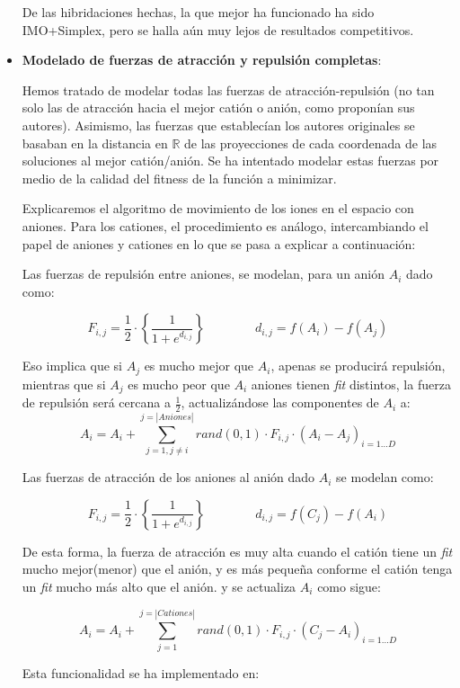 \documentclass[a4paper,11pt]{article}
\begin{document}
\begin{itemize}
\begin{itemize}
 \end{itemize}
 
  De las hibridaciones hechas, la que mejor ha funcionado ha sido IMO+Simplex, pero se halla aún muy lejos de resultados
  competitivos.
 \item \textbf{Modelado de fuerzas de atracción y repulsión completas}:
 
 Hemos tratado de modelar todas las fuerzas de atracción-repulsión (no tan solo las de atracción hacia
 el mejor catión o anión, como proponían sus autores). Asimismo, las fuerzas que establecían los autores
 originales se basaban en la distancia en $\mathbb{R}$ de las proyecciones de cada coordenada de las soluciones
 al mejor catión/anión. Se ha intentado modelar estas fuerzas por medio de la calidad del fitness de la función
 a minimizar. 
 
 Explicaremos el algoritmo de movimiento de los iones en el espacio con aniones. Para los cationes, el procedimiento es
 análogo, intercambiando el papel de aniones y cationes en lo que se pasa a explicar a continuación:
 
 Las fuerzas de repulsión entre aniones, se modelan, para un anión $A_i$ dado como:
 
 $$F_{i,j} = \frac{1}{2} \cdot \left\{\frac{1}{1+e^{d_{i,j}}}\right\} \qquad \qquad d_{i,j} = {f(A_i) - f(A_j)}$$ 
 
 Eso implica que si $A_j$ es mucho mejor que $A_i$, apenas se producirá repulsión, mientras que si $A_j$ es mucho peor que $A_i$
 aniones tienen \textit{fit} distintos, la fuerza de repulsión será cercana a $\frac{1}{2}$, actualizándose las componentes de $A_i$
 a:
  $$A_i = A_i + \sum_{j=1, j\neq i}^{j=|Aniones|} rand(0,1)\cdot F_{i,j}\cdot (A_i - A_j)_{i=1\ldots D}$$
  
 Las fuerzas de atracción de los aniones al anión dado $A_i$ se modelan como:
 
 $$F_{i,j} = \frac{1}{2} \cdot \left\{\frac{1}{1+e^{d_{i,j}}}\right\} \qquad \qquad d_{i,j} = {f(C_j) - f(A_i)}$$ 

 De esta forma, la fuerza de atracción es muy alta cuando el catión tiene un \textit{fit} mucho mejor(menor) que el anión, y
 es más pequeña conforme el catión tenga un \textit{fit} mucho más alto que el anión.
 y se actualiza $A_i$ como sigue:
 
 $$A_i = A_i + \sum_{j=1}^{j=|Cationes|} rand(0,1)\cdot F_{i,j}\cdot (C_j - A_i)_{i=1\ldots D}$$
 
 Esta funcionalidad se ha implementado en:
 

\end{itemize}
\end{document}
